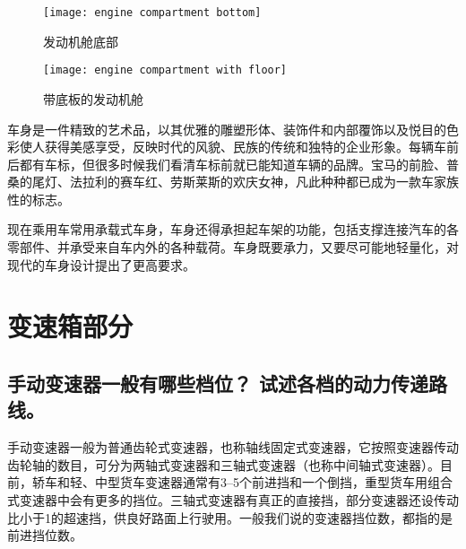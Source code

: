 \documentclass[UTF8]{ctexart}
\numberwithin{figure}{section}
\numberwithin{table}{section}
\begin{document}
\begin{figure}[htbp]
	\centering
	\begin{minipage}[b]{0.4\textwidth}
		\centering
		\texttt{[image: engine compartment bottom]}
		\caption{发动机舱底部}
		\label{engine compartment bottom}
	\end{minipage}
	\begin{minipage}[b]{0.5\textwidth}
		\centering
		\texttt{[image: engine compartment with floor]}
		\caption{带底板的发动机舱}
		\label{engine compartment with floor}
	\end{minipage}
\end{figure}

车身是一件精致的艺术品，以其优雅的雕塑形体、装饰件和内部覆饰以及悦目的色彩使人获得美感享受，反映时代的风貌、民族的传统和独特的企业形象。每辆车前后都有车标，但很多时候我们看清车标前就已能知道车辆的品牌。宝马的前脸、普桑的尾灯、法拉利的赛车红、劳斯莱斯的欢庆女神，凡此种种都已成为一款车家族性的标志。

现在乘用车常用承载式车身，车身还得承担起车架的功能，包括支撑连接汽车的各零部件、并承受来自车内外的各种载荷。车身既要承力，又要尽可能地轻量化，对现代的车身设计提出了更高要求。

\newpage

\section{变速箱部分}
\subsection{手动变速器一般有哪些档位？ 试述各档的动力传递路线。}

手动变速器一般为普通齿轮式变速器，也称轴线固定式变速器，它按照变速器传动齿轮轴的数目，可分为两轴式变速器和三轴式变速器（也称中间轴式变速器）。目前，轿车和轻、中型货车变速器通常有\numrange[range-phrase = $\,\sim\,$]{3}{5}个前进挡和一个倒挡，重型货车用组合式变速器中会有更多的挡位。三轴式变速器有真正的直接挡，部分变速器还设传动比小于1的超速挡，供良好路面上行驶用。一般我们说的变速器挡位数，都指的是前进挡位数。
\end{document}
